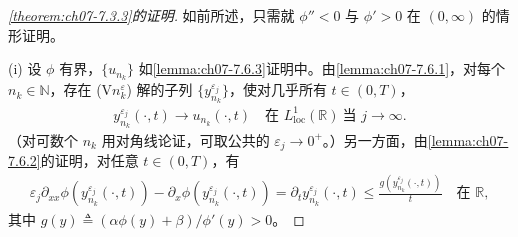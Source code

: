 \documentclass[../../main.tex]{subfiles}%
\begin{document}
\begin{proof}[\cref{theorem:ch07-7.3.3}的证明]
如前所述，只需就 $\phi''<0$ 与 $\phi'>0$ 在 $(0,\infty)$ 的情形证明。

(i) 设 $\phi$ 有界，$\{u_{n_k}\}$ 如\cref{lemma:ch07-7.6.3}证明中。由\cref{lemma:ch07-7.6.1}，对每个 $n_k\in\mathbb{N}$，存在 (V$n_k^\varepsilon$) 解的子列 $\{y_{n_k}^{\varepsilon_j}\}$，使对几乎所有 $t\in(0,T)$，
\begin{align}
y_{n_k}^{\varepsilon_j}(\cdot,t)\to u_{n_k}(\cdot,t)\quad\text{在 }L^1_{\mathrm{loc}}(\mathbb{R})\ \text{当 }j\to\infty. \label{align:ch07-7.168}
\end{align}
（对可数个 $n_k$ 用对角线论证，可取公共的 $\varepsilon_j\to0^+$。）另一方面，由\cref{lemma:ch07-7.6.2}的证明，对任意 $t\in(0,T)$，有
\begin{align}
\varepsilon_j\partial_{xx}\phi(y_{n_k}^{\varepsilon_j}(\cdot,t))-\partial_x\phi(y_{n_k}^{\varepsilon_j}(\cdot,t))
=\partial_t y_{n_k}^{\varepsilon_j}(\cdot,t)\leqslant\frac{g(y_{n_k}^{\varepsilon_j}(\cdot,t))}{t}\quad\text{在 }\mathbb{R}, \label{align:ch07-7.169}
\end{align}
其中 $g(y)\triangleq(\alpha\phi(y)+\beta)/\phi'(y)>0$。


\end{proof}
\end{document}
